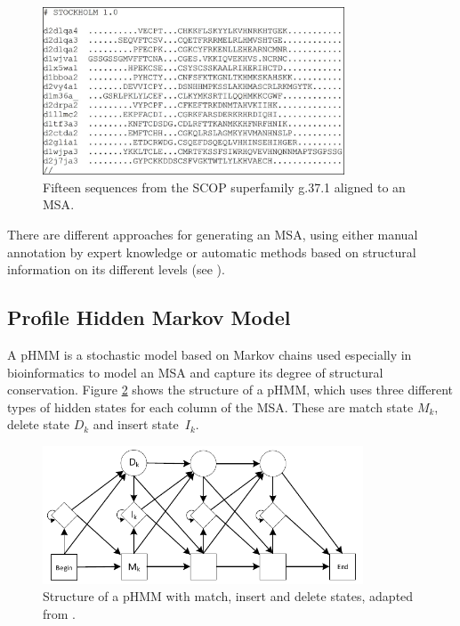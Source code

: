 \begin{figure}[h!]
	\begin{center}
		\includegraphics[width=0.8\textwidth]{fig/MSA}
	\end{center}
	\caption{Fifteen sequences from the \acs{SCOP} superfamily g.37.1 aligned to an \acs{MSA}.}
	\label{fig:MSA}
\end{figure}



There are different approaches for generating an \ac{MSA}, using either manual annotation by expert knowledge or automatic methods based on structural information on its different levels (see \cite[Chapter~6]{Durbin.1998}).


\subsection{Profile Hidden Markov Model}

A \ac{pHMM} is a stochastic  model based on Markov chains used especially in bioinformatics to model an \ac{MSA} and capture its degree of structural conservation.   Figure \ref{fig:pHMM} shows the structure of a \ac{pHMM}, which uses three different types of hidden states for each column of the \ac{MSA}. These are match state $M_k$, delete state $D_k$ and insert \mbox{state $I_k$.}

\begin{figure}[h!]
	\begin{center}
		\includegraphics[width=0.85\textwidth]{fig/pHMM}
	\end{center}
	\caption[Structure of a pHMM.]{Structure of a \acs{pHMM} with match, insert and delete states, adapted from \cite{Durbin.1998}.}
	\label{fig:pHMM}
\end{figure}


